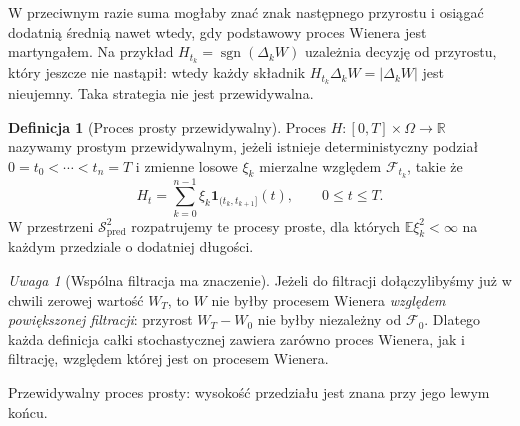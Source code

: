 \documentclass[11pt,a4paper,oneside]{report}
\numberwithin{equation}{chapter}
\theoremstyle{plain}
\theoremstyle{definition}
\newtheorem{definicja}{Definicja}[chapter]
\theoremstyle{remark}
\newtheorem{uwaga}{Uwaga}[chapter]
\newcommand{\R}{\mathbb{R}}
\newcommand{\E}{\mathbb{E}}
\newcommand{\calF}{\mathcal{F}}
\newcommand{\calS}{\mathcal{S}}
\newcommand{\ind}[1]{\mathbf{1}_{#1}}
\begin{document}
W przeciwnym razie suma mogłaby znać znak następnego
przyrostu i osiągać dodatnią średnią nawet wtedy, gdy
podstawowy proces Wienera jest martyngałem. Na przykład
$H_{t_k}=\operatorname{sgn}(\Delta_kW)$
uzależnia decyzję od przyrostu, który jeszcze nie nastąpił:
wtedy każdy składnik $H_{t_k}\Delta_kW=|\Delta_kW|$
jest nieujemny. Taka strategia nie jest przewidywalna.

\begin{definicja}[Proces prosty przewidywalny]
Proces $H:[0,T]\times\Omega\to\R$ nazywamy prostym
przewidywalnym, jeżeli istnieje deterministyczny podział
$0=t_0<\cdots<t_n=T$ i zmienne losowe $\xi_k$
mierzalne względem $\calF_{t_k}$, takie że
\[
H_t=\sum_{k=0}^{n-1}\xi_k\ind{(t_k,t_{k+1}]}(t),
\qquad 0\le t\le T.
\tag{2.1}\label{eq:ito-step}
\]
W przestrzeni $\calS_{\mathrm{pred}}^2$ rozpatrujemy
te procesy proste, dla których $\E\xi_k^2<\infty$
na każdym przedziale o dodatniej długości.
\end{definicja}

\begin{uwaga}[Wspólna filtracja ma znaczenie]
Jeżeli do filtracji dołączylibyśmy już w chwili zerowej
wartość $W_T$, to $W$ nie byłby procesem Wienera
\emph{względem powiększonej filtracji}: przyrost
$W_T-W_0$ nie byłby niezależny od $\calF_0$.
Dlatego każda definicja całki stochastycznej zawiera
zarówno proces Wienera, jak i filtrację, względem której
jest on procesem Wienera.
\end{uwaga}

\begin{center}
\par\smallskip\small Przewidywalny proces prosty: wysokość przedziału jest znana przy jego lewym końcu.
\end{center}
\end{document}
